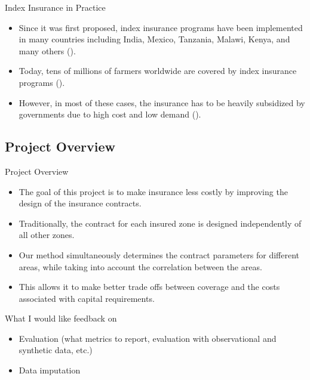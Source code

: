 \documentclass{beamer}
\begin{document}
\begin{frame}{Index Insurance in Practice}
\begin{itemize}
    \setlength\itemsep{1.5em}
    \item Since it was first proposed, index insurance programs have been implemented in many countries including India, Mexico, Tanzania, Malawi, Kenya, and many others (\cite{jensen2017agricultural}). 
    
    \item Today, tens of millions of farmers worldwide are covered by index insurance programs (\cite{greatrex2015scaling}). 
    
    \item However, in most of these cases, the insurance has to be heavily subsidized by governments due to high cost and low demand (\cite{greatrex2015scaling}). 
\end{itemize}
\end{frame}

\subsection{Project Overview}
\begin{frame}{Project Overview}
 \begin{itemize}
    \setlength\itemsep{1em}
     \item The goal of this project is to make insurance less costly by improving the design of the insurance contracts. 
    \item Traditionally, the contract for each insured zone is designed independently of all other zones. %
    \item Our method simultaneously determines the contract parameters for different areas, while taking into account the correlation between the areas. 
    \item This allows it to make better trade offs between coverage and the costs associated with capital requirements.
 \end{itemize}
\end{frame}

\begin{frame}{What I would like feedback on}
    \begin{itemize}
       \setlength\itemsep{1em}
        \item Evaluation (what metrics to report, evaluation with observational and synthetic data, etc.)
       \item Data imputation
    \end{itemize}
   \end{frame}
\end{document}
